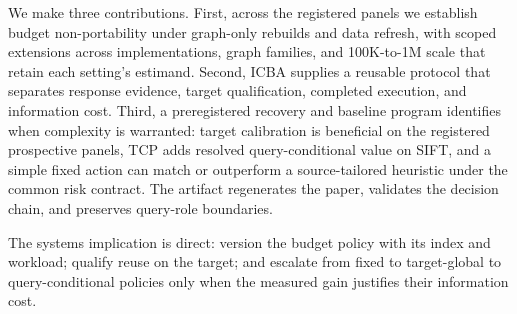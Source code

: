 We make three contributions. First, across the registered panels we establish budget non-portability under graph-only rebuilds and data refresh, with scoped extensions across implementations, graph families, and 100K-to-1M scale that retain each setting's estimand. Second, ICBA supplies a reusable protocol that separates response evidence, target qualification, completed execution, and information cost. Third, a preregistered recovery and baseline program identifies when complexity is warranted: target calibration is beneficial on the registered prospective panels, TCP adds resolved query-conditional value on SIFT, and a simple fixed action can match or outperform a source-tailored heuristic under the common risk contract. The artifact regenerates the paper, validates the decision chain, and preserves query-role boundaries.

The systems implication is direct: version the budget policy with its index and workload; qualify reuse on the target; and escalate from fixed to target-global to query-conditional policies only when the measured gain justifies their information cost.
